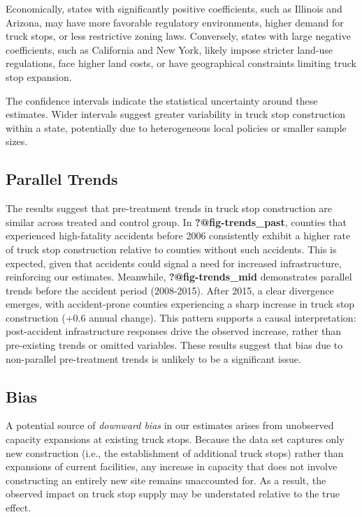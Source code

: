 \documentclass[
  8pt,
  12pt]{article}
\begin{document}
Economically, states with significantly positive coefficients, such as
Illinois and Arizona, may have more favorable regulatory environments,
higher demand for truck stops, or less restrictive zoning laws.
Conversely, states with large negative coefficients, such as California
and New York, likely impose stricter land-use regulations, face higher
land costs, or have geographical constraints limiting truck stop
expansion.

The confidence intervals indicate the statistical uncertainty around
these estimates. Wider intervals suggest greater variability in truck
stop construction within a state, potentially due to heterogeneous local
policies or smaller sample sizes.

\subsection{Parallel Trends}\label{parallel-trends}

The results suggest that pre-treatment trends in truck stop construction
are similar across treated and control group. In
\textbf{?@fig-trends\_past}, counties that experienced high-fatality
accidents before 2006 consistently exhibit a higher rate of truck stop
construction relative to counties without such accidents. This is
expected, given that accidents could signal a need for increased
infrastructure, reinforcing our estimates. Meanwhile,
\textbf{?@fig-trends\_mid} demonstrates parallel trends before the
accident period (2008-2015). After 2015, a clear divergence emerges,
with accident-prone counties experiencing a sharp increase in truck stop
construction (+0.6 annual change). This pattern supports a causal
interpretation: post-accident infrastructure responses drive the
observed increase, rather than pre-existing trends or omitted variables.
These results suggest that bias due to non-parallel pre-treatment trends
is unlikely to be a significant issue.

\subsection{Bias}\label{bias}

A potential source of \emph{downward bias} in our estimates arises from
unobserved capacity expansions at existing truck stops. Because the data
set captures only new construction (i.e., the establishment of
additional truck stops) rather than expansions of current facilities,
any increase in capacity that does not involve constructing an entirely
new site remains unaccounted for. As a result, the observed impact on
truck stop supply may be understated relative to the true effect.
\end{document}
